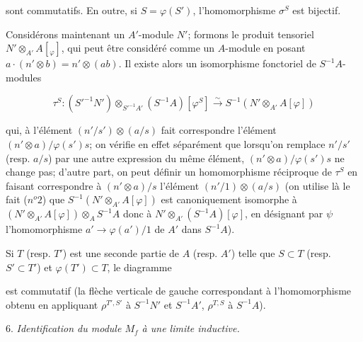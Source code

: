 sont commutatifs. En outre, si $S = \varphi(S')$, l'homomorphisme $\sigma^S$ est bijectif.

Considérons maintenant un $A'$-module $N'$; formons le produit tensoriel $N' \otimes_{A'} A[_{\varphi}]$, qui peut être considéré comme un $A$-module en posant $a \cdot (n' \otimes b) = n' \otimes (ab)$. Il existe alors un isomorphisme fonctoriel de $S^{-1}A$-modules

$$\tau^S: (S'^{-1}N') \otimes_{S'^{-1}A'} (S^{-1}A)[\varphi^S] \xrightarrow{\sim} S^{-1}(N' \otimes_{A'} A[\varphi])$$

\newpage


qui, à l'élément $(n'/s') \otimes (a/s)$ fait correspondre l'élément $(n' \otimes a)/\varphi(s')s$; on vérifie en effet séparément que lorsqu'on remplace $n'/s'$ (resp. $a/s$) par une autre expression du même élément, $(n' \otimes a)/\varphi(s')s$ ne change pas; d'autre part, on peut définir un homomorphisme réciproque de $\tau^S$ en faisant correspondre à $(n' \otimes a)/s$ l'élément $(n'/1) \otimes (a/s)$ (on utilise là le fait ($n^o 2$) que $S^{-1}(N' \otimes_{A'} A[\varphi])$ est canoniquement isomorphe à $(N' \otimes_{A'} A[\varphi]) \otimes_A S^{-1}A$ donc à $N' \otimes_{A'} (S^{-1}A)[\varphi]$, en désignant par $\psi$ l'homomorphisme $a' \to \varphi(a')/1$ de $A'$ dans $S^{-1}A$).

Si $T$ (resp. $T'$) est une seconde partie de $A$ (resp. $A'$) telle que $S \subset T$ (resp. $S' \subset T'$) et $\varphi(T') \subset T$, le diagramme


est commutatif (la flèche verticale de gauche correspondant à l'homomorphisme obtenu en appliquant $\rho^{T',S'}$ à $S^{-1}N'$ et $S^{-1}A'$, $\rho^{T,S}$ à $S^{-1}A$).

6. \emph{Identification du module $M_f$ à une limite inductive.}

